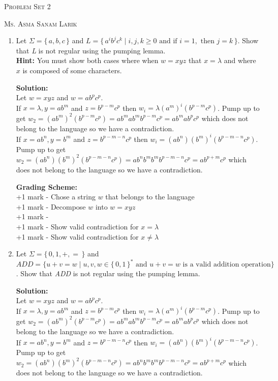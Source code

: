 \documentclass[11pt, article, oneside]{memoir}
\newcommand{\set}[1]{\{\, #1\, \}}
\begin{document}
\begin{center}
\LARGE{\textsc{Problem Set 2}}
 
\large{\textsc{Ms. Asma Sanam Larik}}
\end{center}

\begin{enumerate}
    \item
        Let \(\Sigma = \set{a, b, c}\) and \(L = \set{ {a^i}{b^j}{c^k} \mid i, j, k \ge 0 \text{ and if } i = 1,  \text{ then } j = k}\). Show that \textit{L} is not regular using the pumping lemma.
        \\\textbf{Hint:} You must show both cases where when \(w = xyz\) that \(x = \lambda\) and where \(x\) is composed of some characters.

        \textbf{Solution:}
        \\Let \(w = xyz\) and \(w = ab^pc^p\).
        \\If \(x = \lambda, y = ab^m\) and \(z = b^{p - m}c^p\) then \(w_i = \lambda(a^m)^i(b^{p - m}c^p)\). Pump up to get \(w_2 = (ab^m)^2(b^{p - m}c^p) = ab^mab^mb^{p - m}c^p = ab^mab^pc^p\) which does not belong to the language so we have a contradiction.
        \\If \(x = ab^n, y = b^m\) and \(z = b^{p - m - n}c^p\) then \(w_i = (ab^n)(b^m)^i(b^{p - m - n}c^p)\). Pump up to get \(w_2 = (ab^n)(b^m)^2(b^{p - m - n}c^p) = ab^nb^mb^mb^{p - m - n}c^p = ab^{p + m}c^p\) which does not belong to the language so we have a contradiction.

        \textbf{Grading Scheme:}
        \\+1 mark - Chose a string \(w\) that belongs to the language
        \\+1 mark - Decompose \(w\) into \(w = xyz\)
        \\+1 mark - 
        \\+1 mark - Show valid contradiction for \(x = \lambda\)
        \\+1 mark - Show valid contradiction for \(x \neq \lambda\)
        
    \item 
        Let \(\Sigma = \set{0, 1, +, =}\) and \(ADD = \{ u+v=w \mid u, v, w \in \set{0, 1}^* \text{ and } u+v=w \text{ is a valid addition operation}\}\). Show that \textit{ADD} is not regular using the pumping lemma.
        
        \textbf{Solution:}
        \\Let \(w = xyz\) and \(w = ab^pc^p\).
        \\If \(x = \lambda, y = ab^m\) and \(z = b^{p - m}c^p\) then \(w_i = \lambda(a^m)^i(b^{p - m}c^p)\). Pump up to get \(w_2 = (ab^m)^2(b^{p - m}c^p) = ab^mab^mb^{p - m}c^p = ab^mab^pc^p\) which does not belong to the language so we have a contradiction.
        \\If \(x = ab^n, y = b^m\) and \(z = b^{p - m - n}c^p\) then \(w_i = (ab^n)(b^m)^i(b^{p - m - n}c^p)\). Pump up to get \(w_2 = (ab^n)(b^m)^2(b^{p - m - n}c^p) = ab^nb^mb^mb^{p - m - n}c^p = ab^{p + m}c^p\) which does not belong to the language so we have a contradiction.


\end{enumerate}
\end{document}
